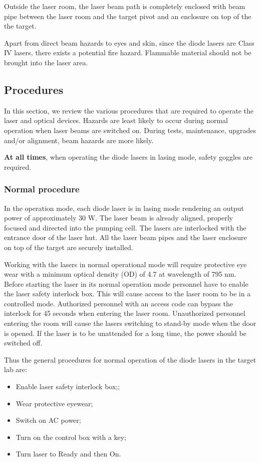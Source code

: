 {Outside the laser room, the laser beam path is completely enclosed with beam 
pipe between the laser room and the target pivot and an enclosure on top of the 
the target. 

Apart from direct beam hazards to eyes and skin, since the diode lasers are 
Class IV lasers, there exists a potential fire hazard. Flammable material 
should not be brought into the laser area.  

\subsection{Procedures}

In this section, we review the various procedures that are required to operate the
laser and optical devices. Hazards are least likely to occur during normal operation
when laser beams are switched on. During tests, maintenance,
upgrades and/or alignment,  beam hazards are more likely.

{\bf At all times}, when operating the diode lasers in lasing mode, safety goggles
are required.

\subsubsection{Normal procedure}
In the operation mode, each diode laser is in lasing mode rendering an output 
power of approximately 30 W. The laser beam is already aligned, properly 
focused and directed into the pumping cell. The lasers are interlocked with the
entrance door of the laser hut. All the laser beam pipes and the laser 
enclosure on top of the target are securely installed.

Working with the lasers in normal operational mode will require protective 
eye wear with a minimum optical 
density (OD) of 4.7 at wavelength of 795 nm. Before
starting the laser in its normal operation mode personnel have to enable the
laser safety interlock box. This will cause access to the laser room to be in 
a controlled mode. Authorized personnel with an access code can 
bypass the interlock for 45 seconds when entering the laser room. Unauthorized
personnel entering the room will cause the lasers switching to stand-by mode
when the door is opened. If the laser is to be unattended for a long time, the 
power should be switched off.

Thus the general procedures for normal operation of the diode lasers in the target lab are:

\begin {itemize}
\item Enable laser safety interlock box;;
\item Wear protective eyewear;
\item Switch on AC power;
\item Turn on the control box with a key; 
\item Turn laser to Ready and then On.
\end {itemize}

}
